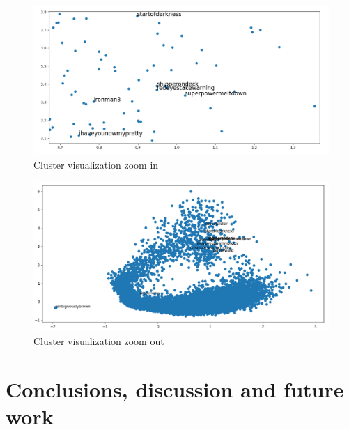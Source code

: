 \documentclass[letterpaper]{article}
\begin{document}
		\begin{figure}
		\centering
		\includegraphics[width=1\linewidth]{../images/cluster-36-visualization-new-corpus-v3-1024-ironman3-font-16-zoom-in.png}
		\caption{Cluster visualization zoom in}
		\label{fig:cluster-visualization-zoom-in}
	\end{figure}
	
	
	\begin{figure}
		\centering
		\includegraphics[width=1\linewidth]{../images/cluster-36-visualization-new-corpus-v3-1024-ironman3-zoom-out.png}
		\caption{Cluster visualization zoom out}
		\label{fig:cluster-visualization-zoom-out}
	\end{figure}
	
	
	
	\section{Conclusions, discussion and future work}
	 
\end{document}
